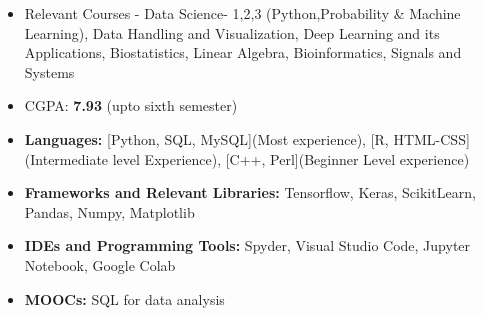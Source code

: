 \documentclass[10pt,a4paper,ragged2e]{altacv}
\begin{document}

\begin{fullwidth}
\makecvheader




{}
\begin{itemize}
\item Relevant Courses - Data Science- 1,2,3 (Python,Probability \&
Machine Learning), Data Handling and Visualization, Deep Learning and its Applications, Biostatistics, Linear Algebra, Bioinformatics, Signals and Systems
\item CGPA: {\bf 7.93} (upto sixth semester)
\end{itemize}


\begin{itemize}

\item {\bf Languages: }[Python, SQL, MySQL](Most experience), [R, HTML-CSS](Intermediate level Experience), [C++, Perl](Beginner Level  experience)
\item {\bf Frameworks and Relevant Libraries: }Tensorflow, Keras, ScikitLearn, Pandas, Numpy, Matplotlib
\item {\bf IDEs and Programming Tools: } Spyder, Visual Studio Code, Jupyter Notebook, Google Colab
\item {\bf MOOCs:} SQL for data analysis
\end{itemize}




\end{fullwidth}
\end{document}
